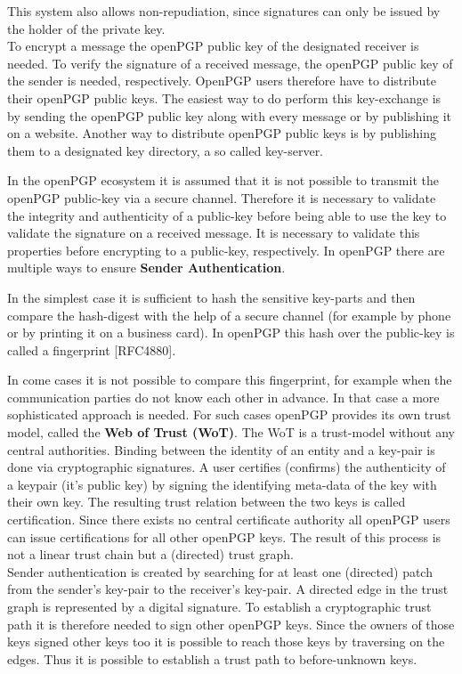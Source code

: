This system also allows non-repudiation, since signatures can only be issued by the holder of the private key.\\


To encrypt a message the openPGP public key of the designated receiver is needed. To verify the signature of a received message, the openPGP public key of the sender is needed, respectively. OpenPGP users therefore have to distribute their openPGP public keys. The easiest way to do perform this key-exchange is by sending the openPGP public key along with every message or by publishing it on a website. Another way to distribute openPGP public keys is by publishing them to a designated key directory, a so called key-server.


In the openPGP ecosystem it is assumed that it is not possible to transmit the openPGP public-key via a secure channel. Therefore it is necessary to validate the integrity and authenticity of a public-key before being able to use the key to validate the signature on a received message. It is necessary to validate this properties before encrypting to a public-key, respectively. In openPGP there are multiple ways to ensure \textbf{Sender Authentication}.

In the simplest case it is sufficient to hash the sensitive key-parts and then compare the hash-digest with the help of a secure channel (for example by phone or by printing it on a business card). In openPGP this hash over the public-key is called a fingerprint [RFC4880].


In come cases it is not possible to compare this fingerprint, for example when the communication parties do not know each other in advance. In that case a more sophisticated approach is needed. For such cases openPGP provides its own trust model, called the \textbf{Web of Trust (WoT)}. The WoT is a trust-model without any central authorities. Binding between the identity of an entity and a key-pair is done via cryptographic signatures. A user certifies (confirms) the authenticity of a keypair (it's public key) by signing the identifying meta-data of the key with their own key. The resulting trust relation between the two keys is called certification. Since there exists no central certificate authority all openPGP users can issue certifications for all other openPGP keys. The result of this process is not a linear trust chain but a (directed) trust graph. \\

Sender authentication is created by searching for at least one (directed) patch from the sender's key-pair to the receiver's key-pair. A directed edge in the trust graph is represented by a digital signature. To establish a cryptographic trust path it is therefore needed to sign other openPGP keys. Since the owners of those keys signed other keys too it is possible to reach those keys by traversing on the edges. Thus it is possible to establish a trust path to before-unknown keys.

